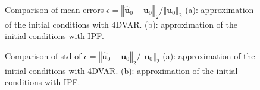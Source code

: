 \documentclass[10pt,openany,onecolumn,a4wide,pof]{article}
\newcommand{\gras}[1]{\boldsymbol{#1}}
\newcommand{\norme}[1]{\left\Vert #1\right\Vert_2}
\newcommand{\point}{\gras{u}} %
\newcommand{\error}{\epsilon} %
\begin{document}
\begin{figure}[h]
\center
{}
\vspace{-1em}
\caption{\small Comparison of mean errors $\error = \norme{\hat{\point}_0-\point_0}/\norme{\point_0}$ (a): approximation of the initial conditions with 4DVAR. (b): approximation of the initial conditions with IPF.}
\label{fig-err}
\end{figure}

\begin{figure}[h]
\center
{}
\vspace{-1em}
\caption{\small Comparison of std of $\error = \norme{\hat{\point}_0-\point_0}/\norme{\point_0}$ (a): approximation of the initial conditions with 4DVAR. (b): approximation of the initial conditions with IPF.}
\label{fig-std}
\end{figure}
\end{document}
